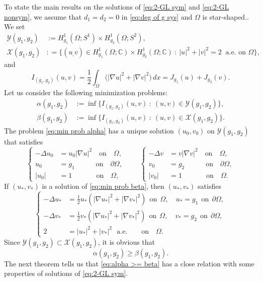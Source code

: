\documentclass[a4paper,10pt,reqno]{amsart}
\theoremstyle{definition}
\newcommand{\calX}{{\mathcal X}}
\newcommand{\calY}{{\mathcal Y}}
\newcommand{\Om}{{\Omega}}
\newcommand{\pa}{\partial}
\newcommand{\qon}{{\quad \mbox{on} \quad}}
\numberwithin{equation}{section}
\begin{document}
 To state the main results on the solutions of  \eqref{eq:2-GL sym} and \eqref{eq:2-GL nonsym}, we assume that $d_1=d_2=0$ in \eqref{eq:deg of g sys} and $\Om$ is star-shaped..
 We set
 \begin{align*}
 \calY(g_1,g_2) &:= H^1_{g_1} (\Om;S^1) \times H^1_{g_2} (\Om;S^2),\\
 \calX(g_1, g_2) & : =\Big\{  (u_ ,v) \in H^1_{g_1}(\Om; \mathbb C) \times   H^1_{g_2} (\Om; \mathbb C) ~:~  |u|^2 + |v|^2= 2~  \text{ a.e. on } \Om\Big\},
 \end{align*}
 and
 \[   I_{(g_1,g_2)} (u , v)   =\frac12  \int_\Om  \big(|\nabla u|^2+|\nabla v|^2  \big)\, dx  = J_{g_1}(u)+J_{g_2} (v).
\]
Let us consider the following minimization problems:
\begin{align}
\label{eq:min prob alpha}
\alpha(g_1,g_2) &:= \inf \big\{ I_{(g_1,g_2)} (u,v) ~:~ (u,v) \in \calY (g_1,g_2)\big\},\\
\label{eq:min prob beta}
\beta(g_1,g_2) &:= \inf \big\{ I_{(g_1,g_2)} (u,v) ~:~ (u,v) \in \calX (g_1,g_2)\big\}.
\end{align}
The problem \eqref{eq:min prob alpha} has   a unique solution  $(u_0,v_0)$ on $\calY(g_1,g_2)$ that satisfies
\[ \left\{
\begin{aligned}
-\Delta u_0& = u_0 |\nabla u|^2 \quad \text{on}\quad \Om,\\
u_0&=g_1 \qquad \qon \pa\Omega, \\
|u_0|&=1\qquad ~~ \qon \Om,
\end{aligned}\right.
\qquad\left\{
\begin{aligned}
-\Delta v& = v |\nabla v|^2 \quad \text{on}\quad \Om,\\
v_0&=g_2 \qquad \qon \pa\Omega, \\
|v_0|&=1 \qquad ~~ \qon \Om.
\end{aligned}\right.
\]
If $ (u_*,v_*)$ is a solution of \eqref{eq:min prob beta}, then $(u_*,v_*)$ satisfies
\[ \left\{
\begin{aligned}
-\Delta u_*& = \frac12 u_* ( |\nabla u_*|^2+ |\nabla v_*|^2) ~~ \text{on}~~ \Om, \quad
u_* =g_1    ~~ \text{on}~~  \pa\Omega, \\
-\Delta v_*& = \frac12 v_* ( |\nabla u_*|^2+ |\nabla v_*|^2) ~~ \text{on}~~ \Om, \quad
v_* =g_2    ~~ \text{on}~~  \pa\Omega, \\
2&=|u_*|^2+|v_*|^2 ~~~ \text{a.e.} \quad  \qon \Om.
\end{aligned}\right.
\]
Since $\calY(g_1,g_2) \subset \calX(g_1,g_2)$, it is obvious that
\begin{equation}\label{eq:alpha >= beta}
\alpha (g_1,g_2) \ge \beta (g_1,g_2).
\end{equation}
The next theorem tells us that  \eqref{eq:alpha >= beta} has a close relation with some properties of solutions of \eqref{eq:2-GL sym}.
\end{document}
